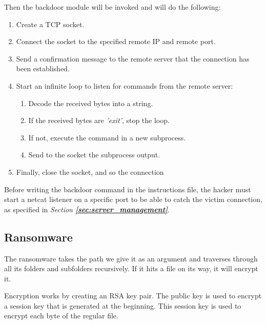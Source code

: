 Then the backdoor module will be invoked and will do the following:
\begin{enumerate}[label=\textbf{\arabic*.}]
    \item Create a TCP socket.
    \item Connect the socket to the specified remote IP and remote port.
    \item Send a confirmation message to the remote server that the connection has been established.
    \item Start an infinite loop to listen for commands from the remote server:
    \begin{enumerate}
        \item Decode the received bytes into a string.
        \item If the received bytes are \textit{'exit'}, stop the loop.
        \item If not, execute the command in a new subprocess.
        \item Send to the socket the subprocess output.
    \end{enumerate}
    \item Finally, close the socket, and so the connection
\end{enumerate}

Before writing the backdoor command in the instructions file, the hacker must start a netcat listener on a specific port to be able to catch the victim connection, as specified in \textit{Section \textbf{\ref{sec:server_management}}}.


\subsection{Ransomware}
\label{sec:ransomware}

The ransomware takes the path we give it as an argument and traverses through all its folders and subfolders recursively. If it hits a file on its way, it will encrypt it.

Encryption works by creating an RSA key pair. The public key is used to encrypt a session key that is generated at the beginning. This session key is used to encrypt each byte of the regular file.

